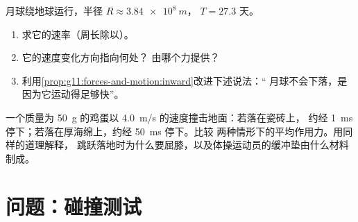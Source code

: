 \begin{exercise}[$\star\star\star$]\label{exo:g11:forces-and-motion:14}
月球绕地球运行，半径 $R \approx \qty{3.84e8}{m}$， $T = \num{27.3}$ 天。
\begin{enumerate}
  \item 求它的速率（周长除以）。
  \item 它的速度变化方向指向何处？
        由哪个力提供？
  \item 利用\cref{prop:g11:forces-and-motion:inward}改进下述说法：“
        月球不会下落，是因为它运动得足够快”。
\end{enumerate}
\end{exercise}

\begin{exercise}[$\star\star\star$]\label{exo:g11:forces-and-motion:15}
一个质量为 \qty{50}{g} 的鸡蛋以 \qty{4.0}{m/s} 的速度撞击地面：若落在瓷砖上，
约经 \qty{1}{ms} 停下；若落在厚海绵上，约经 \qty{50}{ms} 停下。比较
两种情形下的平均作用力。用同样的道理解释，
跳跃落地时为什么要屈膝，以及体操运动员的缓冲垫由什么材料制成。
\end{exercise}

\section{问题：碰撞测试}

